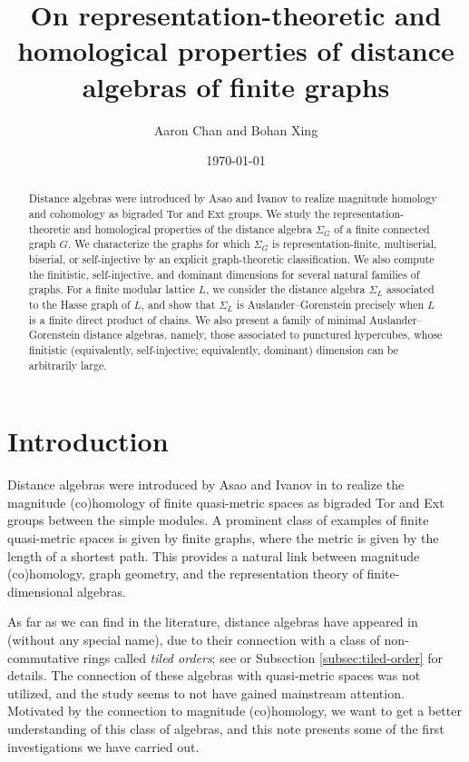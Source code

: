 \documentclass[a4paper,leqno]{amsart}
\title[On distance algebras of finite graphs]{On representation-theoretic and homological properties of distance algebras of finite graphs}
\author{Aaron Chan and Bohan Xing}
\date{\today}
\begin{document}
\begin{abstract}
Distance algebras were introduced by Asao and Ivanov to realize magnitude homology and cohomology as bigraded Tor and Ext groups.  We study the representation-theoretic and homological properties of the distance algebra $\Sigma_G$ of a finite connected graph $G$.  We characterize the graphs for which $\Sigma_G$ is representation-finite, multiserial, biserial, or self-injective by an explicit graph-theoretic classification.  We also compute the finitistic, self-injective, and dominant dimensions for several natural families of graphs.  For a finite modular lattice $L$, we consider the distance algebra $\Sigma_L$ associated to the Hasse graph of $L$, and show that $\Sigma_L$ is Auslander--Gorenstein precisely when $L$ is a finite direct product of chains.  We also present a family of minimal Auslander--Gorenstein distance algebras, namely, those associated to punctured hypercubes, whose finitistic (equivalently, self-injective; equivalently, dominant) dimension can be arbitrarily large.
\end{abstract}


\maketitle

\tableofcontents

\section{Introduction}

Distance algebras were introduced by Asao and Ivanov in \cite{AI24} to realize the magnitude (co)homology of finite quasi-metric spaces as bigraded Tor and Ext groups between the simple modules.  
A prominent class of examples of finite quasi-metric spaces is given by finite graphs, where the metric is given by the length of a shortest path.  This provides a natural link between magnitude (co)homology, graph geometry, and the representation theory of finite-dimensional algebras.  

As far as we can find in the literature, distance algebras have appeared in \cite{GHZ98} (without any special name), due to their connection with a class of non-commutative rings called \emph{tiled orders}; see \cite{GHZ98,IL26}  or Subsection \ref{subsec:tiled-order} for details.
The connection of these algebras with quasi-metric spaces was not utilized, and the study seems to not have gained mainstream attention.  
Motivated by the connection to magnitude (co)homology, we want to get a better understanding of this class of algebras, and this note presents some of the first investigations we have carried out. 
\end{document}
